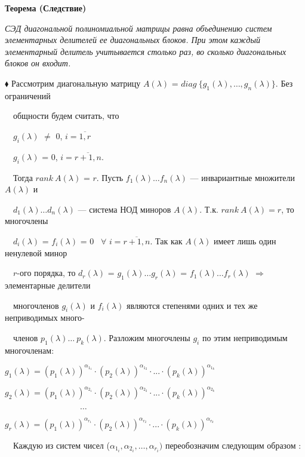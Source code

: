 \documentclass[a4paper, 12pt]{report}
\begin{document}
	\par\bigskip
	\textbf{Теорема (Следствие)}
	
	\textit{СЭД диагональной полиномиальной матрицы равна объединению систем элементарных делителей ее диагональных блоков. При этом каждый элементарный делитель учитывается столько раз, во сколько диагональных блоков он входит.}
	\par\bigskip
	$\blacklozenge$ Рассмотрим диагональную матрицу $A(\lambda)$ = $diag \ \{g_1(\lambda), \dots, g_n(\lambda)\}$. Без ограничений 
	
	$\quad$общности будем считать, что 
	
	$\quad$$g_i(\lambda)$ $\not=$ 0, $i = \overline{1, r}$
	
	$\quad$$g_i(\lambda)$ = 0, $i = \overline{r+1, n}$.
	\par\bigskip
	$\quad$Тогда $rank \ A(\lambda)$ = $r$. Пусть $f_1(\lambda) \dots f_n(\lambda)$ --- инвариантные множители $A(\lambda)$ и 
	
	$\quad$$d_1(\lambda) \dots d_n(\lambda)$  --- система НОД миноров $A(\lambda)$. Т.к. $rank \  A(\lambda) = r$, то многочлены
	
	$\quad$$d_i(\lambda)$ = $f_i(\lambda)$ = 0 \ $\forall$ $i = \overline{r+1, n}$. Так как $A(\lambda)$ имеет лишь один ненулевой минор
	
	$\quad$$r$-ого порядка, то $d_r(\lambda)$ = $g_1(\lambda) \dots g_r(\lambda)$ = $f_1(\lambda) \dots f_r(\lambda)$ $\Rightarrow$ элементарные делители 
	
	$\quad$многочленов $g_i(\lambda)$ и $f_i(\lambda)$ являются степенями одних и тех же неприводимых много-
	
	$\quad$членов $p_1(\lambda) \dots \ p_k(\lambda)$. Разложим многочлены $g_i$ по этим неприводимым многочленам:
	\par\bigskip
	\hspace{1 cm}$g_1(\lambda) = (p_1(\lambda))^{\alpha_1_1} \cdot (p_2(\lambda))^{\alpha_1_2} \cdot ... \cdot (p_k(\lambda))^{\alpha_1_k}$
	
	\hspace{1 cm}$g_2(\lambda) = (p_1(\lambda))^{\alpha_2_1} \cdot (p_2(\lambda))^{\alpha_2_2} \cdot ... \cdot (p_k(\lambda))^{\alpha_2_k}$
	
	\hspace{1 cm}$\qquad\qquad\qquad\qquad\quad\dots$
	
	\hspace{1 cm}$g_r(\lambda) = (p_1(\lambda))^{\alpha_r_1} \cdot (p_2(\lambda))^{\alpha_r_2} \cdot ... \cdot (p_k(\lambda))^{\alpha_r_k}$
	\par\bigskip
	$\quad$Каждую из систем чисел ($\alpha_1_i, \alpha_2_i, \dots, \alpha_r_i)$ переобозначим следующим образом :
	
\end{document}

